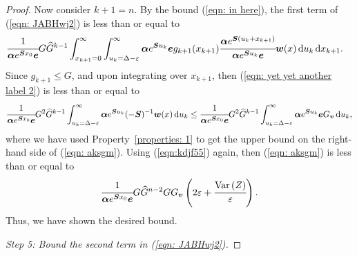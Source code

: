 \begin{proof}
		Now consider \(k+1=n\). By the bound (\ref{eqn: in here}), the first term of (\ref{eqn: JABHwj2}) is less than or equal to 
		\begin{align}
			&\cfrac{1}{\boldsymbol \alpha e^{\boldsymbol{S} x_0 }\boldsymbol e}G \widehat G^{k-1}
			\int_{x_{k+1}=0}^\infty \int_{u_k=\Delta-\varepsilon}^\infty \boldsymbol \alpha e^{\boldsymbol{S}u_k}\boldsymbol e g_{k+1}(x_{k+1}) \cfrac{\boldsymbol\alpha e^{\boldsymbol{S}(u_k+x_{k+1})}}{\boldsymbol \alpha e^{\boldsymbol{S}u_k}\boldsymbol e}\boldsymbol w(x)\, \mathrm{d} u_k \, \mathrm{d} x_{k+1}. \label{eqn: yet yet another label 2}
			\end{align}
			{Since \(g_{k+1}\leq G\), and upon integrating over \(x_{k+1}\), then (\ref{eqn: yet yet another label 2}) is less than or equal to }
			\begin{align}
			 \cfrac{1}{\boldsymbol \alpha e^{\boldsymbol{S} x_0 }\boldsymbol e}G^2\widehat G^{k-1}  
			\int_{u_k=\Delta-\varepsilon}^\infty \boldsymbol\alpha e^{\boldsymbol{S}u_k}(-\boldsymbol S)^{-1}{\boldsymbol w}(x) \, \mathrm{d} u_k 
			\leq \cfrac{1}{\boldsymbol \alpha e^{\boldsymbol{S} x_0 }\boldsymbol e}G^2 \widehat G^{k-1}  
			\int_{u_k=\Delta-\varepsilon}^\infty  \boldsymbol \alpha e^{\boldsymbol S u_k} \boldsymbol e G_{\boldsymbol v} \, \mathrm{d} u_k , \label{eqn: aksgm}
		\end{align}
		where we have used Property~\ref{properties: 1} to get the upper bound on the right-hand side of (\ref{eqn: aksgm}). Using (\ref{eqn:kdjf55}) again, then (\ref{eqn: aksgm}) is less than or equal to
		\begin{align}
			\cfrac{1}{\boldsymbol \alpha e^{\boldsymbol{S} x_0 }\boldsymbol e}G\widehat G^{n-2}   G G_{\boldsymbol v}\left(2\varepsilon + \cfrac{\mathrm{Var}\left(Z\right)}{\varepsilon}\right).
		\end{align}
		Thus, we have shown the desired bound. 

\emph{Step 5: Bound the second term in (\ref{eqn: JABHwj2}).}


\end{proof}
